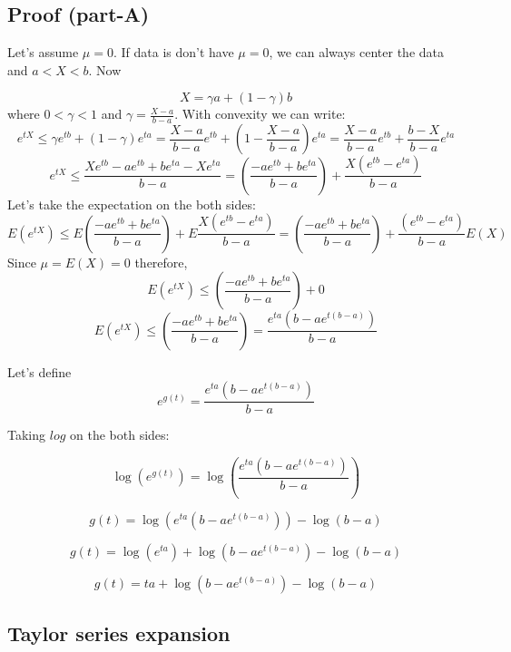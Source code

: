 \documentclass[
]{article}
\begin{document}
\hypertarget{proof-part-a}{%
\subsection{Proof (part-A)}\label{proof-part-a}}

Let's assume \(\mu =0\). If data is don't have \(\mu =0\), we can always
center the data and \(a<X<b\). Now

\[X=\gamma a+\left( 1-\gamma  \right)b\] where \(0<\gamma <1\) and
\(\gamma =\frac{X-a}{b-a}\). With convexity we can write:
\[{{e}^{tX}}\le \gamma {{e}^{tb}}+\left( 1-\gamma  \right){{e}^{ta}}=\frac{X-a}{b-a}{{e}^{tb}}+\left( 1-\frac{X-a}{b-a} \right){{e}^{ta}}=\frac{X-a}{b-a}{{e}^{tb}}+\frac{b-X}{b-a}{{e}^{ta}}\]
\[{{e}^{tX}}\le \frac{X{{e}^{tb}}-a{{e}^{tb}}+b{{e}^{ta}}-X{{e}^{ta}}}{b-a}=\left( \frac{-a{{e}^{tb}}+b{{e}^{ta}}}{b-a} \right)+\frac{X\left( {{e}^{tb}}-{{e}^{ta}} \right)}{b-a}\]
Let's take the expectation on the both sides:
\[E\left( {{e}^{tX}} \right)\le E\left( \frac{-a{{e}^{tb}}+b{{e}^{ta}}}{b-a} \right)+E\frac{X\left( {{e}^{tb}}-{{e}^{ta}} \right)}{b-a}=\left( \frac{-a{{e}^{tb}}+b{{e}^{ta}}}{b-a} \right)+\frac{\left( {{e}^{tb}}-{{e}^{ta}} \right)}{b-a}E\left( X \right)\]
Since \(\mu =E\left( X \right)=0\) therefore,
\[E\left( {{e}^{tX}} \right)\le \left( \frac{-a{{e}^{tb}}+b{{e}^{ta}}}{b-a} \right)+0\]
\[E\left( {{e}^{tX}} \right)\le \left( \frac{-a{{e}^{tb}}+b{{e}^{ta}}}{b-a} \right)=\frac{{{e}^{ta}}\left( b-a{{e}^{t\left( b-a \right)}} \right)}{b-a}\]

Let's define
\[{{e}^{g\left( t \right)}}=\frac{{{e}^{ta}}\left( b-a{{e}^{t\left( b-a \right)}} \right)}{b-a}\]

Taking \(log\) on the both sides:

\[\log \left( {{e}^{g\left( t \right)}} \right)=\log \left( \frac{{{e}^{ta}}\left( b-a{{e}^{t\left( b-a \right)}} \right)}{b-a} \right)\]

\[g\left( t \right)=\log \left( {{e}^{ta}}\left( b-a{{e}^{t\left( b-a \right)}} \right) \right)-\log \left( b-a \right)\]

\[g\left( t \right)=\log \left( {{e}^{ta}} \right)+\log \left( b-a{{e}^{t\left( b-a \right)}} \right)-\log \left( b-a \right)\]

\begin{equation}
g\left( t \right)=ta+\log \left( b-a{{e}^{t\left( b-a \right)}} \right)-\log \left( b-a \right)
\end{equation}

\hypertarget{taylor-series-expansion}{%
\subsection{Taylor series expansion}\label{taylor-series-expansion}}
\end{document}
